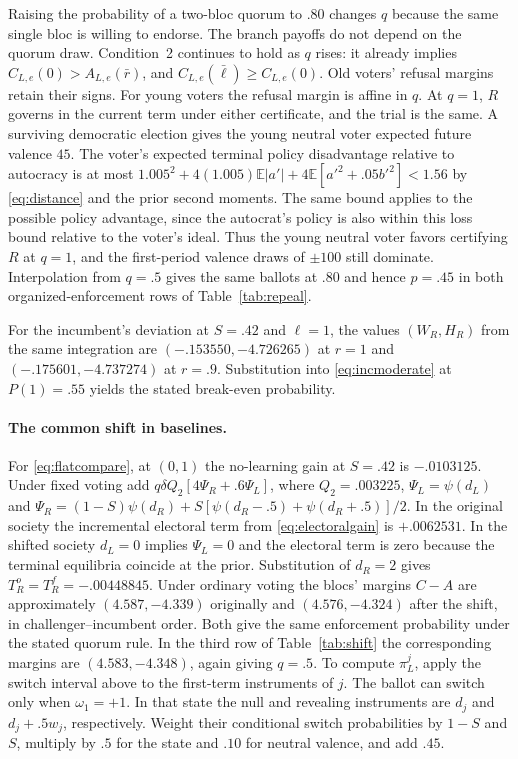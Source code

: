 \documentclass[11pt,letterpaper]{article}
\newcommand{\E}{\mathbb E}
\begin{document}
Raising the probability of a two-bloc quorum to $.80$ changes $q$ because the same single bloc is willing to endorse. The branch payoffs do not depend on the quorum draw. Condition~2 continues to hold as $q$ rises: it already implies $C_{L,e}(0)>A_{L,e}(\bar r)$, and $C_{L,e}(\bar\ell)\ge C_{L,e}(0)$. Old voters' refusal margins retain their signs. For young voters the refusal margin is affine in $q$. At $q=1$, $R$ governs in the current term under either certificate, and the trial is the same. A surviving democratic election gives the young neutral voter expected future valence $45$. The voter's expected terminal policy disadvantage relative to autocracy is at most $1.005^2+4(1.005)\E|a'|+4\E[a'^2+.05b'^2]<1.56$ by \eqref{eq:distance} and the prior second moments. The same bound applies to the possible policy advantage, since the autocrat's policy is also within this loss bound relative to the voter's ideal. Thus the young neutral voter favors certifying $R$ at $q=1$, and the first-period valence draws of $\pm100$ still dominate. Interpolation from $q=.5$ gives the same ballots at $.80$ and hence $p=.45$ in both organized-enforcement rows of Table~\ref{tab:repeal}.

For the incumbent's deviation at $S=.42$ and $\ell=1$, the values $(W_R,H_R)$ from the same integration are $(-.153550,-4.726265)$ at $r=1$ and $(-.175601,-4.737274)$ at $r=.9$. Substitution into \eqref{eq:incmoderate} at $P(1)=.55$ yields the stated break-even probability.

\paragraph{The common shift in baselines.}
For \eqref{eq:flatcompare}, at $(0,1)$ the no-learning gain at $S=.42$ is $-.0103125$. Under fixed voting add $q\delta Q_2[4\Psi_R+.6\Psi_L]$, where $Q_2=.003225$, $\Psi_L=\psi(d_L)$ and $\Psi_R=(1-S)\psi(d_R)+S[\psi(d_R-.5)+\psi(d_R+.5)]/2$. In the original society the incremental electoral term from \eqref{eq:electoralgain} is $+.0062531$. In the shifted society $d_L=0$ implies $\Psi_L=0$ and the electoral term is zero because the terminal equilibria coincide at the prior. Substitution of $d_R=2$ gives $T_R^o=T_R^f=-.00448845$. Under ordinary voting the blocs' margins $C-A$ are approximately $(4.587,-4.339)$ originally and $(4.576,-4.324)$ after the shift, in challenger--incumbent order. Both give the same enforcement probability under the stated quorum rule. In the third row of Table~\ref{tab:shift} the corresponding margins are $(4.583,-4.348)$, again giving $q=.5$. To compute $\pi_L^j$, apply the switch interval above to the first-term instruments of $j$. The ballot can switch only when $\omega_1=+1$. In that state the null and revealing instruments are $d_j$ and $d_j+.5w_j$, respectively. Weight their conditional switch probabilities by $1-S$ and $S$, multiply by $.5$ for the state and $.10$ for neutral valence, and add $.45$.
\end{document}
